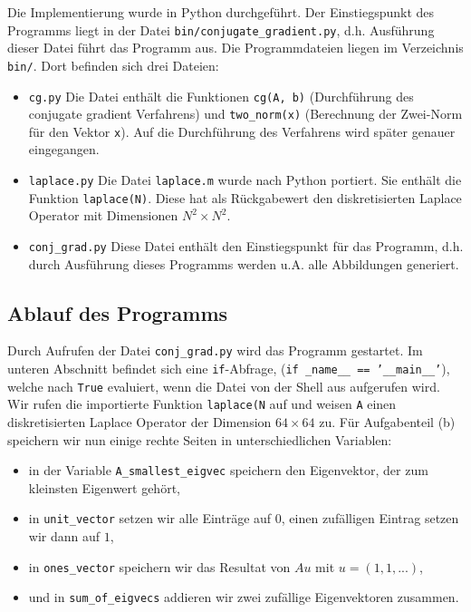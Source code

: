 \documentclass[10pt,a4paper]{article}
\begin{document}
Die Implementierung wurde in Python durchgeführt. Der Einstiegspunkt des
Programms liegt in der Datei \texttt{bin/conjugate\_gradient.py}, d.h. Ausführung
dieser Datei führt das Programm aus.
Die Programmdateien liegen im Verzeichnis \texttt{bin/}. Dort befinden sich drei
Dateien:
\begin{itemize}
\item \texttt{cg.py}\qquad
  Die Datei enthält die Funktionen \texttt{cg(A, b)} (Durchführung des conjugate
  gradient Verfahrens) und \texttt{two\_norm(x)} (Berechnung der Zwei-Norm für
  den Vektor \texttt{x}). Auf die Durchführung des Verfahrens wird später
  genauer eingegangen.
  
\item \texttt{laplace.py}\qquad
  Die Datei \texttt{laplace.m} wurde nach Python portiert. Sie enthält die
  Funktion \texttt{laplace(N)}. Diese hat als Rückgabewert den diskretisierten
  Laplace Operator mit Dimensionen $N^{2} \times N^{2}$.
  
\item \texttt{conj\_grad.py}\qquad
  Diese Datei enthält den Einstiegspunkt für das Programm, d.h. durch Ausführung
  dieses Programms werden u.A. alle Abbildungen generiert.
  
\end{itemize}

\subsection{Ablauf des Programms}

Durch Aufrufen der Datei \texttt{conj\_grad.py} wird das Programm gestartet. Im
unteren Abschnitt befindet sich eine \texttt{if}-Abfrage,
(\texttt{if \_name\_\_ == '\_\_main\_\_'}), welche nach \texttt{True} evaluiert,
wenn die Datei von der Shell aus aufgerufen wird.
Wir rufen die importierte Funktion \texttt{laplace(N} auf und weisen \texttt{A}
einen diskretisierten Laplace Operator der Dimension $64 \times 64$ zu.
Für Aufgabenteil (b) speichern wir nun einige rechte Seiten in unterschiedlichen
Variablen:
\begin{itemize}
\item in der Variable \texttt{A\_smallest\_eigvec} speichern den Eigenvektor,
  der zum kleinsten Eigenwert gehört,
\item in \texttt{unit\_vector} setzen wir alle Einträge auf $0$, einen
  zufälligen Eintrag setzen wir dann auf $1$,
\item in \texttt{ones\_vector} speichern wir das Resultat von $Au$ mit $u = (1,
  1, ...)$,
\item und in \texttt{sum\_of\_eigvecs} addieren wir zwei zufällige Eigenvektoren
  zusammen.
\end{itemize}
\end{document}
